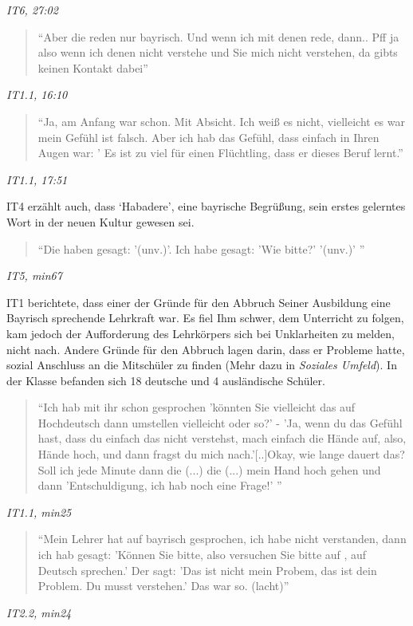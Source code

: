 \centerline{\textit{IT6, 27:02}}
\begin{quote}
    ``Aber die reden nur bayrisch. Und wenn ich mit denen rede, dann.. Pff ja also wenn ich denen nicht verstehe und Sie mich nicht verstehen, da gibts keinen Kontakt dabei''
\end{quote}
\centerline{\textit{IT1.1, 16:10}}
\begin{quote}
    ``Ja, am Anfang war schon. Mit Absicht. Ich weiß es nicht, vielleicht es war mein Gefühl ist falsch. Aber ich hab das Gefühl, dass einfach in Ihren Augen war: ' Es ist zu viel für einen Flüchtling, dass er dieses Beruf lernt.''
\end{quote}
\centerline{\textit{IT1.1, 17:51}}
IT4 erzählt auch, dass `Habadere', eine bayrische Begrüßung, sein erstes gelerntes Wort in der neuen Kultur gewesen sei.
\begin{quote}
    ``Die haben gesagt: '(unv.)'. Ich habe gesagt: 'Wie bitte?' '(unv.)' ''
\end{quote}
\centerline{\textit{IT5, min67}}
IT1 berichtete, dass einer der Gründe für den Abbruch Seiner Ausbildung eine Bayrisch sprechende Lehrkraft war. Es fiel Ihm schwer, dem Unterricht zu folgen, kam jedoch der Aufforderung des Lehrkörpers sich bei Unklarheiten zu melden, nicht nach. Andere Gründe für den Abbruch lagen darin, dass er Probleme hatte, sozial Anschluss an die Mitschüler zu finden (Mehr dazu in \textit{Soziales Umfeld}). 
In der Klasse befanden sich 18 deutsche und 4 ausländische Schüler.

\begin{quote}
    ``Ich hab mit ihr schon gesprochen 'könnten Sie vielleicht das auf Hochdeutsch dann umstellen vielleicht oder so?' - 'Ja, wenn du das Gefühl hast, dass du einfach das nicht verstehst, mach einfach die Hände auf, also, Hände hoch, und dann fragst du mich nach.'[..]Okay, wie lange dauert das? Soll ich jede Minute dann die (...) die (...) mein Hand hoch gehen und dann 'Entschuldigung, ich hab noch eine Frage!' ''
\end{quote}
\centerline{\textit{IT1.1, min25}}

\begin{quote}
    ``Mein Lehrer hat auf bayrisch gesprochen, ich habe nicht verstanden, dann ich hab gesagt: 'Können Sie bitte, also versuchen Sie bitte auf , auf Deutsch sprechen.' Der sagt: 'Das ist nicht mein Probem, das ist dein Problem. Du musst verstehen.' Das war so. (lacht)''
\end{quote}
\centerline{\textit{IT2.2, min24}}

